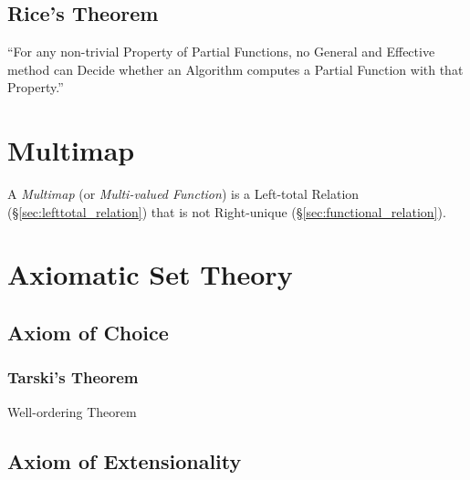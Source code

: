 \subsection{Rice's Theorem}\label{sec:rices_theorem}

``For any non-trivial Property of Partial Functions, no General and
Effective method can Decide whether an Algorithm computes a Partial
Function with that Property.''



\section{Multimap}\label{sec:multimap}

A \emph{Multimap} (or \emph{Multi-valued Function}) is a Left-total
Relation (\S\ref{sec:lefttotal_relation}) that is not Right-unique
(\S\ref{sec:functional_relation}).



\section{Axiomatic Set Theory}\label{sec:axiomatic_set_theory}

\subsection{Axiom of Choice}\label{sec:choice_axiom}

\subsubsection{Tarski's Theorem}\label{sec:tarskis_theorem}

Well-ordering Theorem



\subsection{Axiom of Extensionality}\label{sec:extensionality_axiom}

